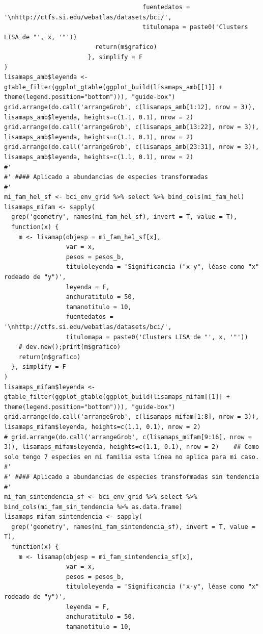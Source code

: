 \documentclass[11pt,]{article}
\begin{document}
\begin{verbatim}
                                      fuentedatos = '\nhttp://ctfs.si.edu/webatlas/datasets/bci/',
                                      titulomapa = paste0('Clusters LISA de "', x, '"'))
                         return(m$grafico)
                       }, simplify = F
)
lisamaps_amb$leyenda <- gtable_filter(ggplot_gtable(ggplot_build(lisamaps_amb[[1]] + theme(legend.position="bottom"))), "guide-box")
grid.arrange(do.call('arrangeGrob', c(lisamaps_amb[1:12], nrow = 3)), lisamaps_amb$leyenda, heights=c(1.1, 0.1), nrow = 2)
grid.arrange(do.call('arrangeGrob', c(lisamaps_amb[13:22], nrow = 3)), lisamaps_amb$leyenda, heights=c(1.1, 0.1), nrow = 2)
grid.arrange(do.call('arrangeGrob', c(lisamaps_amb[23:31], nrow = 3)), lisamaps_amb$leyenda, heights=c(1.1, 0.1), nrow = 2)
#' 
#' #### Aplicado a abundancias de especies transformadas
#' 
mi_fam_hel_sf <- bci_env_grid %>% select %>% bind_cols(mi_fam_hel)
lisamaps_mifam <- sapply(
  grep('geometry', names(mi_fam_hel_sf), invert = T, value = T),
  function(x) {
    m <- lisamap(objesp = mi_fam_hel_sf[x],
                 var = x,
                 pesos = pesos_b,
                 tituloleyenda = 'Significancia ("x-y", léase como "x" rodeado de "y")',
                 leyenda = F,
                 anchuratitulo = 50,
                 tamanotitulo = 10,
                 fuentedatos = '\nhttp://ctfs.si.edu/webatlas/datasets/bci/',
                 titulomapa = paste0('Clusters LISA de "', x, '"'))
    # dev.new();print(m$grafico)
    return(m$grafico)
  }, simplify = F
)
lisamaps_mifam$leyenda <- gtable_filter(ggplot_gtable(ggplot_build(lisamaps_mifam[[1]] + theme(legend.position="bottom"))), "guide-box")
grid.arrange(do.call('arrangeGrob', c(lisamaps_mifam[1:8], nrow = 3)), lisamaps_mifam$leyenda, heights=c(1.1, 0.1), nrow = 2)
# grid.arrange(do.call('arrangeGrob', c(lisamaps_mifam[9:16], nrow = 3)), lisamaps_mifam$leyenda, heights=c(1.1, 0.1), nrow = 2)    ## Como solo tengo 7 especies en mi familia esta línea no aplica para mi caso.
#' 
#' #### Aplicado a abundancias de especies transformadas sin tendencia
#' 
mi_fam_sintendencia_sf <- bci_env_grid %>% select %>% bind_cols(mi_fam_sin_tendencia %>% as.data.frame)
lisamaps_mifam_sintendencia <- sapply(
  grep('geometry', names(mi_fam_sintendencia_sf), invert = T, value = T),
  function(x) {
    m <- lisamap(objesp = mi_fam_sintendencia_sf[x],
                 var = x,
                 pesos = pesos_b,
                 tituloleyenda = 'Significancia ("x-y", léase como "x" rodeado de "y")',
                 leyenda = F,
                 anchuratitulo = 50,
                 tamanotitulo = 10,

\end{verbatim}
\end{document}
